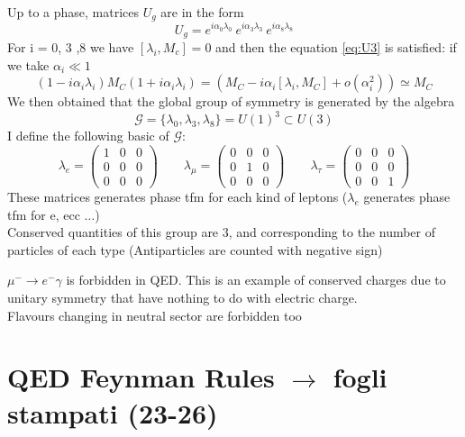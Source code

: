 \documentclass[TheoreticalPhy_ModB.tex]{subfiles}
\begin{document}
Up to a phase, matrices $U_g$ are in the form
\[
U_g = e^{i \alpha_0 \lambda_0} \ e^{i \alpha_3 \lambda_3} \ e^{i \alpha_8 \lambda_8}
\]
For i = 0, 3 ,8 we have $[\lambda_i, M_c] = 0$ and then the equation \ref{eq:U3} is satisfied: if we take $\alpha_i \ll 1$
\[
(1 - i \alpha_i \lambda_i)M_C(1 + i \alpha_i \lambda_i) = (M_C - i \alpha_i [\lambda_i, M_C] + o(\alpha_i^2)) \simeq M_C
\]
We then obtained that the global group of symmetry is generated by the algebra
\[
\mathcal{G} = \{ \lambda_0, \lambda_3, \lambda_8 \} = U(1)^3 \subset U(3)
\]
I define the following basic of $\mathcal{G}$:
\[
\lambda_e =
\begin{pmatrix}
1	& 0 	& 0 \\
0	& 0	& 0 \\
0	& 0	& 0
\end{pmatrix}
\qquad
\lambda_{\mu} =
\begin{pmatrix}
0	& 0 	& 0 \\
0	& 1	& 0 \\
0	& 0	& 0
\end{pmatrix}
\qquad
\lambda_{\tau} =
\begin{pmatrix}
0	& 0 	& 0 \\
0	& 0	& 0 \\
0	& 0	& 1
\end{pmatrix}
\]
These matrices generates phase tfm for each kind of leptons ($\lambda_e$ generates phase tfm for e, ecc $\dots$)\\
Conserved quantities of this group are 3, and corresponding to the number of particles of each type (Antiparticles are counted with negative sign)\\
\begin{example}
$\mu^- \to e^- \gamma$ is forbidden in QED. 
This is an example of conserved charges due to unitary symmetry that have nothing to do with electric charge.\\
Flavours changing in neutral sector are forbidden too
\end{example}

\section{QED Feynman Rules $\to$ fogli stampati (23-26)}
\end{document}
